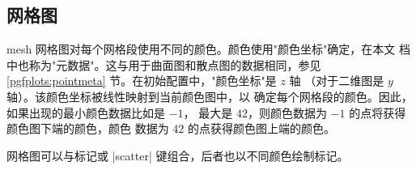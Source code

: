 {\subsection{网格图}
\label{sec:2d:mesh}

\begin{plottype}[/pgfplots]{mesh}
    网格图对每个网格段使用不同的颜色。颜色使用"颜色坐标"确定，在本文
    档中也称为"元数据"。这与用于曲面图和散点图的数据相同，参见
    \ref{pgfplots:pointmeta} 节。在初始配置中，"颜色坐标"是 $z$ 轴
    （对于二维图是 $y$ 轴）。该颜色坐标被线性映射到当前颜色图中，以
    确定每个网格段的颜色。因此，如果出现的最小颜色数据比如是 $-1$，
    最大是 $42$，则颜色数据为 $-1$ 的点将获得颜色图下端的颜色，颜色
    数据为 $42$ 的点获得颜色图上端的颜色。

\pgfplotsexpensiveexample
\begin{codeexample}[]
\end{codeexample}

    网格图可以与标记或 |scatter| 键组合，后者也以不同颜色绘制标记。

\pgfplotsexpensiveexample
\begin{codeexample}[]
\end{codeexample}

\pgfplotsexpensiveexample
\begin{codeexample}[]
\end{codeexample}


\end{plottype}}
